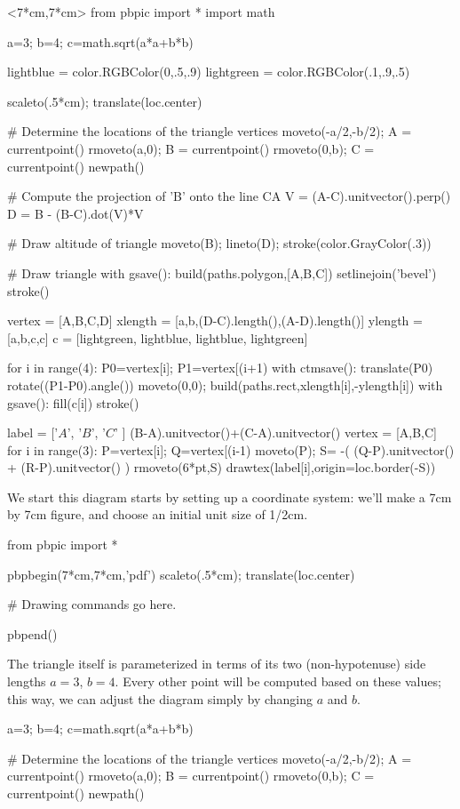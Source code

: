 \documentclass[12pt]{article}
\begin{document}
\hfil\begin{pbpic}<7*cm,7*cm>
from pbpic import *
import math

a=3; b=4; c=math.sqrt(a*a+b*b)

lightblue = color.RGBColor(0,.5,.9)
lightgreen = color.RGBColor(.1,.9,.5)

scaleto(.5*cm); translate(loc.center)

# Determine the locations of the triangle vertices
moveto(-a/2,-b/2); A = currentpoint()
rmoveto(a,0); B = currentpoint()
rmoveto(0,b); C = currentpoint()
newpath()

# Compute the projection of 'B' onto the line CA
V = (A-C).unitvector().perp()
D = B - (B-C).dot(V)*V

# Draw altitude of triangle
moveto(B); lineto(D);
stroke(color.GrayColor(.3))

# Draw triangle
with gsave():
  build(paths.polygon,[A,B,C])
  setlinejoin('bevel')
  stroke()

vertex = [A,B,C,D]
xlength = [a,b,(D-C).length(),(A-D).length()]
ylength = [a,b,c,c]
c = [lightgreen, lightblue, lightblue, lightgreen]

for i in range(4):
  P0=vertex[i]; P1=vertex[(i+1)%
  with ctmsave():
    translate(P0)
    rotate((P1-P0).angle())
    moveto(0,0);
    build(paths.rect,xlength[i],-ylength[i])
  with gsave():
    fill(c[i])
  stroke()

label = ['$A$', '$B$', '$C$' ]
(B-A).unitvector()+(C-A).unitvector()
vertex = [A,B,C]
for i in range(3):
  P=vertex[i]; Q=vertex[(i-1)%
  moveto(P);
  S= -( (Q-P).unitvector() + (R-P).unitvector() )
  rmoveto(6*pt,S)
  drawtex(label[i],origin=loc.border(-S))

\end{pbpic}

We start this diagram starts by setting up a coordinate system: we'll
make a 7cm by 7cm figure, and choose an initial unit size of 1/2cm.

\begin{snippet}
from pbpic import *

pbpbegin(7*cm,7*cm,'pdf')
scaleto(.5*cm); translate(loc.center)

# Drawing commands go here.

pbpend()
\end{snippet}

The triangle itself is parameterized in terms of its two (non-hypotenuse)
side lengths $a=3$, $b=4$.  Every other point will be computed based
on these values; this way, we can adjust the diagram simply by 
changing $a$ and $b$.
\begin{snippet}
a=3; b=4; c=math.sqrt(a*a+b*b)

# Determine the locations of the triangle vertices
moveto(-a/2,-b/2); A = currentpoint()
rmoveto(a,0); B = currentpoint()
rmoveto(0,b); C = currentpoint()
newpath()

\end{snippet}
\end{document}
